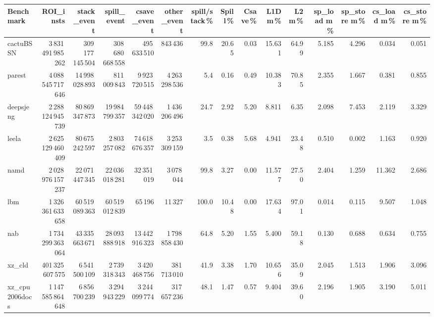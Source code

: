 \documentclass[9pt,landscape,a4paper]{article}
\begin{document}
\vspace{2mm}
\centering
\begin{adjustbox}{max width=\textwidth, max totalheight=0.50\textheight}%
\begin{tabular}{lrrrrrrrrrrrrrr}
\toprule
Benchmark & ROI\_insts & stack\_event & \textbf{spill\_event} & csave\_event & other\_event & spill/stack\,\% & Spill\,\% & Csave\,\% & L1D m\,\% & L2 m\,\% & sp\_load m\,\% & sp\_store m\,\% & cs\_load m\,\% & cs\_store m\,\% \\
\midrule
cactuBSSN & 3\,831\,491\,985\,262 & 309\,177\,145\,504 & 308\,680\,668\,558 & 495\,633\,510 & 843\,436 & 99.8 & 20.65 & 0.03 & 15.631 & 64.99 & 5.185 & 4.296 & 0.034 & 0.051 \\
parest & 4\,088\,545\,717\,646 & 14\,998\,028\,893 & 811\,009\,843 & 9\,923\,720\,515 & 4\,263\,298\,536 & 5.4 & 0.16 & 0.49 & 10.383 & 70.85 & 2.355 & 1.667 & 0.381 & 0.855 \\
deepsjeng & 2\,288\,124\,945\,739 & 80\,869\,347\,873 & 19\,984\,799\,357 & 59\,448\,342\,020 & 1\,436\,206\,496 & 24.7 & 2.92 & 5.20 & 8.811 & 6.35 & 2.098 & 7.453 & 2.119 & 3.329 \\
leela & 2\,625\,129\,460\,409 & 80\,675\,242\,597 & 2\,803\,257\,082 & 74\,618\,676\,357 & 3\,253\,309\,159 & 3.5 & 0.38 & 5.68 & 4.941 & 23.48 & 0.510 & 0.002 & 1.163 & 0.920 \\
namd & 2\,028\,976\,157\,237 & 22\,071\,447\,345 & 22\,036\,018\,281 & 32\,351\,019 & 3\,078\,044 & 99.8 & 3.27 & 0.00 & 11.577 & 27.50 & 2.404 & 1.259 & 11.362 & 2.686 \\
lbm & 1\,326\,361\,633\,658 & 60\,519\,089\,363 & 60\,519\,012\,839 & 65\,196 & 11\,327 & 100.0 & 10.48 & 0.00 & 17.634 & 97.01 & 0.014 & 0.115 & 9.507 & 1.048 \\
nab & 1\,734\,299\,363\,064 & 43\,335\,663\,671 & 28\,093\,888\,918 & 13\,442\,916\,323 & 1\,798\,858\,430 & 64.8 & 5.20 & 1.55 & 5.400 & 59.18 & 0.130 & 0.688 & 0.634 & 0.755 \\
xz\_cld & 401\,325\,607\,575 & 6\,541\,500\,109 & 2\,739\,318\,343 & 3\,420\,468\,756 & 381\,713\,010 & 41.9 & 3.38 & 1.70 & 10.656 & 35.09 & 2.045 & 1.513 & 1.906 & 3.096 \\
xz\_cpu2006docs & 1\,147\,585\,864\,648 & 6\,856\,700\,239 & 3\,294\,943\,229 & 3\,244\,099\,774 & 317\,657\,236 & 48.1 & 1.47 & 0.57 & 9.404 & 39.60 & 2.196 & 1.905 & 3.190 & 5.011 \\

\end{tabular}
\end{adjustbox}
\end{document}
